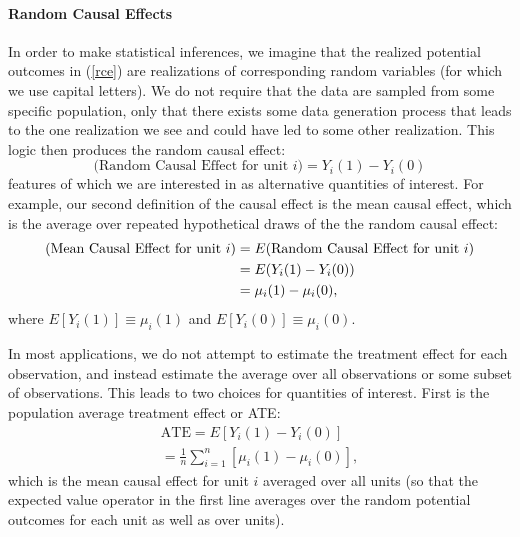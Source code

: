 \documentclass[11pt,titlepage]{article}
\begin{document}
\paragraph{Random Causal Effects} In order to make statistical
inferences, we imagine that the realized potential outcomes in
(\ref{rce}) are realizations of corresponding random variables (for
which we use capital letters).  We do not require that the data are
sampled from some specific population, only that there exists some
data generation process that leads to the one realization we see and
could have led to some other realization.  This logic then produces the
random causal effect:
\begin{equation}
  \label{rance}
  \text{(Random Causal Effect for unit $i$)}  = Y_i(1) - Y_i(0)
\end{equation}
features of which we are interested in as alternative quantities of
interest.  For example, our second definition of the causal effect is
the mean causal effect, which is the average over repeated
hypothetical draws of the the random causal effect:
\begin{align}
  \label{meance}
  \text{(Mean Causal Effect for unit $i$)}
  &= E(\text{Random Causal Effect for unit $i$})\\ 
  &= E(Y_i(1) - Y_i(0))\\ \notag
  &= \mu_i(1) - \mu_i(0),
\end{align}
where $E[Y_i(1)]\equiv\mu_i(1)$ and $E[Y_i(0)]\equiv\mu_i(0)$.

In most applications, we do not attempt to estimate the treatment
effect for each observation, and instead estimate the average over all
observations or some subset of observations.  This leads to two
choices for quantities of interest.  First is the population average
treatment effect or ATE:
\begin{align}
  \label{pate}
  \text{ATE} = E[Y_i(1) - Y_i(0)] \\
             = \frac{1}{n}\sum_{i=1}^n[\mu_i(1) - \mu_i(0)],
\end{align}
which is the mean causal effect for unit $i$ averaged over all units
(so that the expected value operator in the first line averages over
the random potential outcomes for each unit as well as over units).
\end{document}
